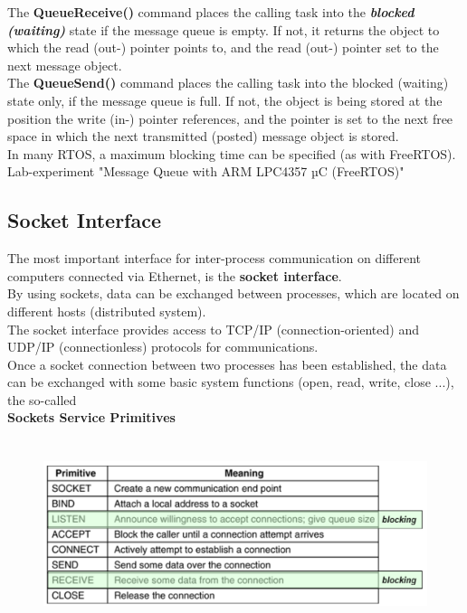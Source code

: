 The \textbf{QueueReceive()} command places the calling task into the \textbf{\textit{blocked (waiting)}} state if the message queue is empty. If not, it returns the object to which the read (out-) pointer points to, and the read (out-) pointer set to the next message object.\\

The \textbf{QueueSend()} command places the calling task into the blocked (waiting) state only, if the message queue is full. If not, the object is being stored at the position the write (in-) pointer references, and the pointer is set to the next free space in which the next transmitted (posted) message object is stored.\\

In many RTOS, a maximum blocking time can be specified (as with FreeRTOS).\\

Lab-experiment "Message Queue with ARM LPC4357 µC (FreeRTOS)"

\subsection{Socket Interface}

The most important interface for inter-process communication on different computers connected via Ethernet, is the \textbf{socket interface}.\\

By using sockets, data can be exchanged between processes, which are located on different hosts (distributed system). \\

The socket interface provides access to TCP/IP (connection-oriented) and UDP/IP (connectionless) protocols for communications. \\

Once a socket connection between two processes has been established, the data can be exchanged with some basic system functions (open, read, write, close ...), the so-called \\

\textbf{Sockets Service Primitives}

 	\begin{figure}[h]
    \centering
    \includegraphics[width=12cm, height=5.5cm]{Images/image19.png}
    \label{fig:Fig 63}
    \end{figure}
    
